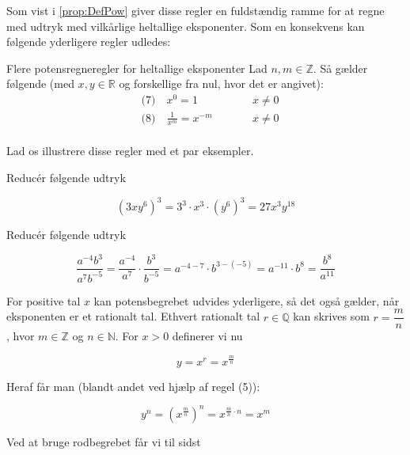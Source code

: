 Som vist i \autoref{prop:DefPow} giver disse regler en fuldstændig ramme for at regne med udtryk med vilkårlige heltallige eksponenter. Som en konsekvens kan følgende yderligere regler udledes:

\begin{proposition}{Flere potensregneregler for heltallige eksponenter}
Lad $n,m\in\mathbb{Z}$. Så gælder følgende (med $x,y\in\mathbb{R}$ og forskellige fra nul, hvor det er angivet):
\[
\begin{aligned}
&\text{(7)}\quad x^{0}=1   &\qquad&   x \neq 0  \\
&\text{(8)}\quad \frac{1}{x^{m}}=x^{-m} &\qquad& x \neq 0 \\
\end{aligned}
\]
\end{proposition}

Lad os illustrere disse regler med et par eksempler.

\begin{example} Reducér følgende udtryk

    \begin{equation*}
\left(3 x y^6\right)^3=3^3 \cdot x^3 \cdot\left(y^6\right)^3=27 x^3 y^{18}
\end{equation*}
\end{example}

\begin{example} Reducér følgende udtryk

\begin{equation*}
\frac{a^{-4} b^3}{a^7 b^{-5}}=\frac{a^{-4}}{a^7} \cdot \frac{b^3}{b^{-5}}=a^{-4-7} \cdot b^{3-(-5)}=a^{-11} \cdot b^8=\frac{b^8}{a^{11}}
\end{equation*}
\end{example}

For positive tal \(x\) kan potensbegrebet udvides yderligere, så det også gælder, når eksponenten er et rationalt tal. Ethvert rationalt tal \(r \in \mathbb{Q}\) kan skrives som \(r = \dfrac{m}{n}\), hvor \(m \in \mathbb{Z}\) og \(n \in \mathbb{N}\). For \(x > 0\) definerer vi nu

\begin{equation*}
y=x^r=x^{\frac{m}{n}}
\end{equation*}

Heraf får man (blandt andet ved hjælp af regel (5)):

\[
y^n = \left(x^{\frac{m}{n}}\right)^n = x^{\frac{m}{n} \cdot n} = x^m
\]

Ved at bruge rodbegrebet får vi til sidst

